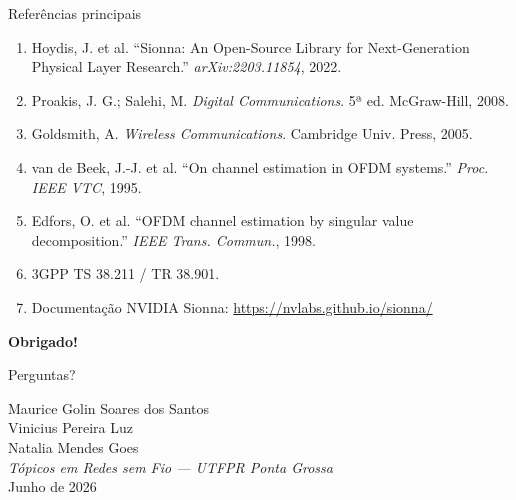 \documentclass[aspectratio=169, 11pt]{beamer}
\begin{document}

\begin{frame}{Referências principais}
    \small
    \begin{enumerate}
        \item Hoydis, J. et al. ``Sionna: An Open-Source Library for Next-Generation Physical Layer Research.'' \textit{arXiv:2203.11854}, 2022.
        \item Proakis, J. G.; Salehi, M. \textit{Digital Communications}. 5ª ed. McGraw-Hill, 2008.
        \item Goldsmith, A. \textit{Wireless Communications}. Cambridge Univ. Press, 2005.
        \item van de Beek, J.-J. et al. ``On channel estimation in OFDM systems.'' \textit{Proc. IEEE VTC}, 1995.
        \item Edfors, O. et al. ``OFDM channel estimation by singular value decomposition.'' \textit{IEEE Trans. Commun.}, 1998.
        \item 3GPP TS 38.211 / TR 38.901.
        \item Documentação NVIDIA Sionna: \url{https://nvlabs.github.io/sionna/}
    \end{enumerate}
\end{frame}

\begin{frame}[plain]
    \centering
    \vfill
    {\Huge\textbf{Obrigado!}}

    \vspace{1cm}
    {\large Perguntas?}

    \vspace{1.5cm}
    \small
    Maurice Golin Soares dos Santos\\
    Vinicius Pereira Luz\\
    Natalia Mendes Goes\\[0.5cm]
    \textit{Tópicos em Redes sem Fio — UTFPR Ponta Grossa}\\
    Junho de 2026
    \vfill
\end{frame}
\end{document}

